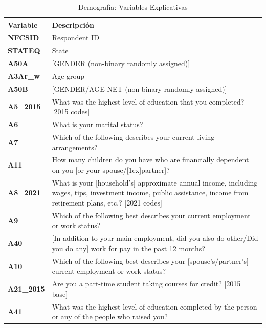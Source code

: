 \documentclass[a4paper, 11pt]{article}
\begin{document}
\begin{table}[ht]
\centering
\begin{tabular}{p{} p{}} 

\toprule
\textbf{Variable} & \textbf{Descripción}\\
\midrule

\textbf{NFCSID} & Respondent ID \\[1ex]
\textbf{STATEQ} & State \\[1ex]
\textbf{A50A} & [GENDER (non-binary randomly assigned)]\\[1ex]
\textbf{A3Ar\_w} & Age group \\[1ex]
\textbf{A50B} & [GENDER/AGE NET (non-binary randomly assigned)] \\[1ex]
\textbf{A5\_2015} & What was the highest level of education that you completed? [2015 codes] \\[1ex]
\textbf{A6} & What is your marital status?\\[1ex]
\textbf{A7} & Which of the following describes your current living arrangements?\\[1ex]
\textbf{A11} & How many children do you have who are financially dependent on you [or your spouse/[1ex]partner]?\\[1ex]
\textbf{A8\_2021} & What is your [household's] approximate annual income, including wages, tips, investment income, public assistance, income from retirement plans, etc.? [2021 codes] \\[1ex]
\textbf{A9} & Which of the following best describes your current employment or work status?  \\[1ex]
\textbf{A40} & [In addition to your main employment, did you also do other/Did you do any] work for pay in the past 12 months?\\[1ex]
\textbf{A10} & Which of the following best describes your [spouse's/partner's] current employment or work status? \\[1ex]
\textbf{A21\_2015} & Are you a part-time student taking courses for credit? [2015 base]\\[1ex]
\textbf{A41} & What was the highest level of education completed by the person or any of the people who raised you?\\
\bottomrule
\end{tabular}
\caption{Demografía: Variables Explicativas}
\label{table:demographics_features}
\end{table}

\clearpage
\end{document}
